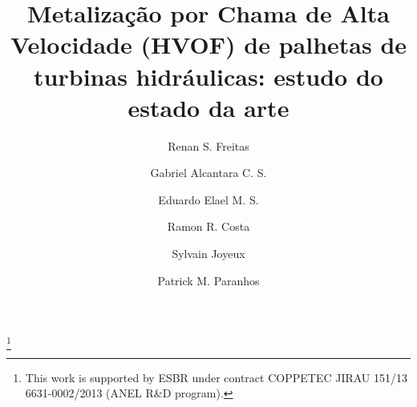 \documentclass{main}
\begin{document}
\begin{frontmatter}

\title{Metalização por Chama de Alta Velocidade (HVOF) de palhetas de turbinas
hidráulicas: estudo do estado da arte
} 

\thanks[footnoteinfo]{This work is supported by ESBR under contract COPPETEC
JIRAU 151/13 6631-0002/2013 (ANEL R\&D program).}

\author[1]{Renan S. Freitas}
\author[1]{Gabriel Alcantara C. S.}
\author[1]{Eduardo Elael M. S.}
\author[1]{Ramon R. Costa}
\author[2]{Sylvain Joyeux}
\author[2]{Patrick M. Paranhos}

  \address[1]{Departamento de Engenharia Elétrica, COPPE UFRJ, Rio de Janeiro,
  Brasil} 
  \address[2]{Centro de Inovação em Robótica (CIR), Rio de Janeiro, Brasil}
 
\begin{abstract}                %
\end{abstract} 

\begin{keyword}
\end{keyword}

\end{frontmatter}







  
 
\appendix
\end{document}
